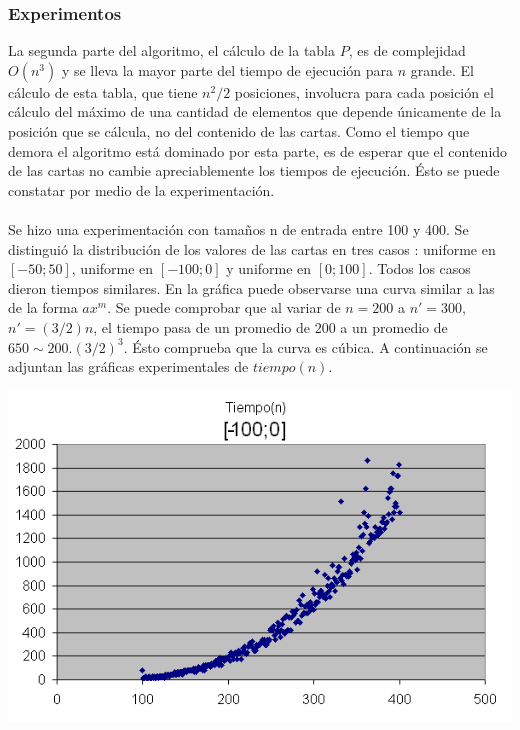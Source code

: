 \subsubsection{Experimentos}
La segunda parte del algoritmo, el c\'alculo de la tabla $P$, es de complejidad $O(n^3)$ y se lleva la mayor parte del tiempo de ejecuci\'on para $n$ grande.
El c\'alculo de esta tabla, que tiene $n^2/2$ posiciones, involucra para cada posici\'on el c\'alculo del m\'aximo de una cantidad de elementos que depende \'unicamente de la posici\'on que se c\'alcula, no del contenido de las cartas. Como el tiempo que demora el algoritmo est\'a dominado por esta parte, es de esperar que el contenido de las cartas no cambie apreciablemente los tiempos de ejecuci\'on. \'Esto se puede constatar por medio de la experimentaci\'on.\\
\\
Se hizo una experimentaci\'on con tama\~nos n de entrada entre 100 y 400. Se distingui\'o la distribuci\'on de los valores de las cartas en tres casos : uniforme en $[-50;50]$, uniforme en $[-100;0]$ y uniforme en $[0;100]$. Todos los casos dieron tiempos similares. En la gr\'afica puede observarse una curva similar a las de la forma $ax^{m}$. Se puede comprobar que al variar de $n=200$ a $n'=300$, $n'=(3/2)n$, el tiempo pasa de un promedio de $200$ a un promedio de $650 \sim 200.(3/2)^3$. \'Esto comprueba que la curva es c\'ubica.
A continuaci\'on se adjuntan las gr\'aficas experimentales de $tiempo(n)$.

\begin{center}
	\includegraphics[scale=0.6]{images/ej1_1.png}
\end{center}

